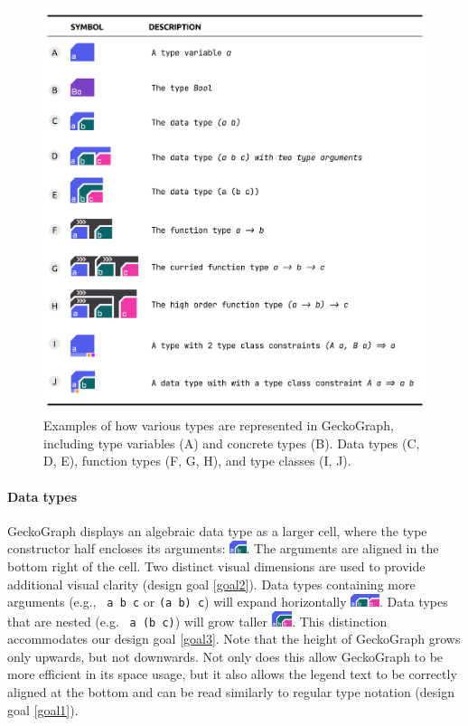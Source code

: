 \begin{figure}[hbt]
  \includegraphics[width=\linewidth]{figures/Design}
  \caption[Examples of various types as represented in GeckoGraph]{
        \label{fig:design}
        Examples of how various types are represented in GeckoGraph, including type variables (A) and concrete types (B). Data types (C, D, E), function types (F, G, H), and type classes (I, J).
  }
\end{figure}


\paragraph{Data types}
GeckoGraph displays an algebraic data type as a larger cell, where the type constructor half encloses its arguments: \includegraphics[height=1em]{figures/DataType.png}. The arguments are aligned in the bottom right of the cell. Two distinct visual dimensions are used to provide additional visual clarity (design goal \ref{goal2}). Data types containing more arguments (e.g., \texttt{ a b c} or \texttt{(a b) c}) will expand horizontally \includegraphics[height=1em]{figures/DataTypeWide.png}. Data types that are nested (e.g. \texttt{ a (b c)}) will grow taller \includegraphics[height=1.2em]{figures/DataTypeNested.png}. This distinction accommodates our design goal \ref{goal3}. Note that the height of GeckoGraph grows only upwards, but not downwards. Not only does this allow GeckoGraph to be more efficient in its space usage, but it also allows the legend text to be correctly aligned at the bottom and can be read similarly to regular type notation (design goal \ref{goal1}).  




